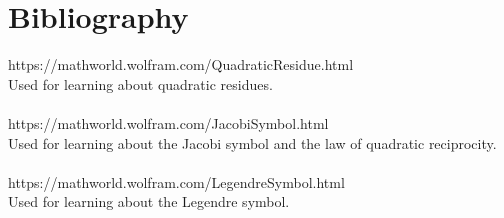 \documentclass[12pt]{article}
\theoremstyle{definition}
\begin{document}
\section{Bibliography}
https://mathworld.wolfram.com/QuadraticResidue.html
\\
Used for learning about quadratic residues.
\\\\
https://mathworld.wolfram.com/JacobiSymbol.html
\\
Used for learning about the Jacobi symbol and the law of quadratic reciprocity.
\\\\
https://mathworld.wolfram.com/LegendreSymbol.html
\\
Used for learning about the Legendre symbol.
\end{document}
